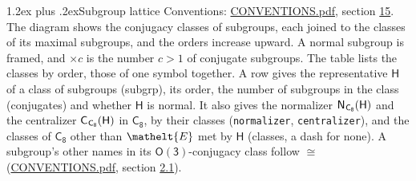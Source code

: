 \documentclass[10pt,a4paper]{article}
\makeatletter
\renewcommand\section{\@startsection{section}{1}{\z@}{-3ex plus -1ex minus -.2ex}%
  {1.2ex plus .2ex}{\normalfont\large\sffamily\bfseries\color{parttitle}}}
\numberwithin{equation}{section}
\newcommand{\eltfont}[1]{{\let\sigma\eltsigma\mathelt{#1}}}
\newcommand{\grp}[1]{\mathsf{#1}}
\newcommand{\cls}[1]{\eltfont{#1}}
\newcommand{\samecls}{\cong}
\newcommand{\hairsp}{\mkern1mu}
\makeatother
\begin{document}
\section{Subgroup lattice}\label{s:subgroups}
Conventions: \href{../../CONVENTIONS.pdf}{CONVENTIONS.pdf}, section \href{../../CONVENTIONS.pdf\#conv.15}{15}.
The diagram shows the conjugacy classes of subgroups, each joined to the classes of its maximal subgroups, and the orders increase upward. \label{n:index.conjugates.c}A normal subgroup is framed, and ${\times}c$ is the number $c > 1$ of conjugate subgroups. The table lists the classes by order, those of one symbol together. \label{n:group.H}\label{n:head.subgroup}\label{n:head.order}\label{n:head.conjugates}\label{n:head.normal}A row gives the representative $\grp{H}$ of a class of subgroups (subgrp), its order, the number of subgroups in the class (conjugates) and whether $\grp{H}$ is normal. \label{n:group.normalizer}\label{n:group.centralizer}\label{n:head.classes}It also gives the normalizer $\grp{N}_{\hairsp \grp{C_{8}}}(\grp{H})$ and the centralizer $\grp{C}_{\hairsp \grp{C_{8}}}(\grp{H})$ in $\grp{C_{8}}$, by their classes (\texttt{normalizer}, \texttt{centralizer}), and the classes of $\grp{C_{8}}$ other than $\cls{E}$ met by $\grp{H}$ (classes, a dash for none). A subgroup's other names in its \href{O3.pdf}{$\grp{O(3)}$}-conjugacy class follow $\samecls$ (\href{../../CONVENTIONS.pdf}{CONVENTIONS.pdf}, section \href{../../CONVENTIONS.pdf\#conv.2.1}{2.1}).
\begin{center}
\end{center}
\end{document}
